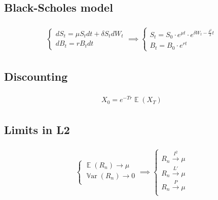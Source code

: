 \documentclass{article}
\def\Var#1{{\operatorname{\mathbb{V}ar} \left({#1}\right)}}
\def\Exp#1{{\operatorname{\mathbb{E}} \left({#1}\right)}}
\def\Eq#1{{\begin{gather}\begin{split} #1 \end{split}\end{gather}}}
\begin{document}
\subsection*{Black-Scholes model}
\Eq{
    \begin{cases}
    dS_t = \mu S_t dt + \delta S_t dW_t \\
    dB_t = rB_t dt
    \end{cases}
    \implies
    \begin{cases}
    S_t = S_0 \cdot e^{\mu t} \cdot e^{\delta W_t - \frac{\delta^2}{2}t} \\
    B_t = B_0 \cdot e ^ {r t}
    \end{cases}
}

\begin{multicols}{2}
    \subsection*{Discounting}
\Eq{
X_0 = e^{-T r}\Exp{X_T}
}

    \subsection*{Limits in L2}
\Eq{
\begin{cases}
\Exp{R_n} \rightarrow \mu \\
\Var{R_n} \rightarrow 0 \\
\end{cases}
\implies
\begin{cases}
R_n \xrightarrow{I^2} \mu \\
R_n \xrightarrow{L'} \mu \\
R_n \xrightarrow{P} \mu \\
\end{cases}
}
\end{multicols}
\end{document}
